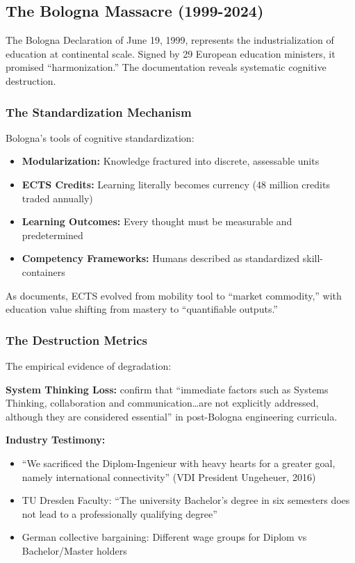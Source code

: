 \subsection{The Bologna Massacre (1999-2024)}

The Bologna Declaration of June 19, 1999, represents the industrialization of education at continental scale. Signed by 29 European education ministers, it promised ``harmonization.'' The documentation reveals systematic cognitive destruction.

\subsubsection{The Standardization Mechanism}

Bologna's tools of cognitive standardization:
\begin{itemize}
\item \textbf{Modularization:} Knowledge fractured into discrete, assessable units
\item \textbf{ECTS Credits:} Learning literally becomes currency (48 million credits traded annually)
\item \textbf{Learning Outcomes:} Every thought must be measurable and predetermined
\item \textbf{Competency Frameworks:} Humans described as standardized skill-containers
\end{itemize}

As \citet{gleeson2021} documents, ECTS evolved from mobility tool to ``market commodity,'' with education value shifting from mastery to ``quantifiable outputs.''

\subsubsection{The Destruction Metrics}

The empirical evidence of degradation:

\textbf{System Thinking Loss:} \citet{kaiser2022} confirm that ``immediate factors such as Systems Thinking, collaboration and communication\ldots are not explicitly addressed, although they are considered essential'' in post-Bologna engineering curricula.

\textbf{Industry Testimony:}
\begin{itemize}
\item ``We sacrificed the Diplom-Ingenieur with heavy hearts for a greater goal, namely international connectivity'' (VDI President Ungeheuer, 2016)
\item TU Dresden Faculty: ``The university Bachelor's degree in six semesters does not lead to a professionally qualifying degree'' \citep{odenbach2015}
\item German collective bargaining: Different wage groups for Diplom vs Bachelor/Master holders \citep{wieschke2020}
\end{itemize}

